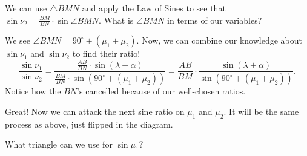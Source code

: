 
We can use $\triangle BMN$ and apply the Law of Sines to see that $\displaystyle \sin \nu_2 = \frac{BM}{BN} \cdot \sin{\angle BMN}.$ What is $\angle BMN$ in terms of our variables?



We see $\angle BMN = 90^{\circ} + (\mu_1 + \mu_2).$ Now, we can combine our knowledge about $\sin \nu_1$ and $\sin \nu_2$ to find their ratio! $$\frac{\sin \nu_1}{\sin \nu_2} = \frac{\frac{AB}{BN}\cdot \sin{(\lambda+\alpha)}}{\frac{BM}{BN}\cdot \sin{(90^{\circ}+(\mu_1 + \mu_2))}} = \frac{AB}{BM} \cdot \frac{\sin{(\lambda+\alpha)}}{\sin{(90^{\circ}+(\mu_1+\mu_2))}}.$$ Notice how the $BN$'s cancelled because of our well-chosen ratios.

Great! Now we can attack the next sine ratio on $\mu_1$ and $\mu_2.$ It will be the same process as above, just flipped in the diagram.

What triangle can we use for $\sin \mu_1?$











